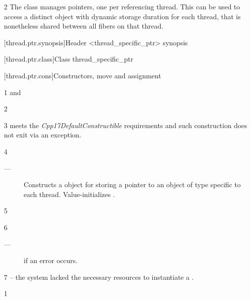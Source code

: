 \documentclass[fontsize=10pt,paper=A4,pagesize,DIV=15]{scrartcl}
\begin{document}
2 The \tptr class manages pointers, one per referencing thread. This can be
used to access a distinct object with dynamic storage duration for each
thread, that is nonetheless shared between all fibers on that thread.

[thread.ptr.synopsis]{Header <thread\_specific\_ptr> synopsis}



[thread.ptr.class]{Class thread\_specific\_ptr}


[thread.ptr.cons]{Constructors, move and assignment}


1 \constraints
{} and 

2 \mandates
{}

3 \precond
{} meets the \emph{Cpp17DefaultConstructible} requirements and such
construction does not exit via an exception.

4 \effects
\begin{description}
    \item[---] Constructs a  object for storing a
               pointer to an object of type  specific to each thread.
               Value-initializes .
\end{description}

5 \postcond
{}

6 \except
\begin{description}
    \item[---]  if an error occurs.
\end{description}

7 \errors
{} -- the system lacked the necessary
resources to instantiate a \tptr.


1 \constraints
{}
\end{document}
